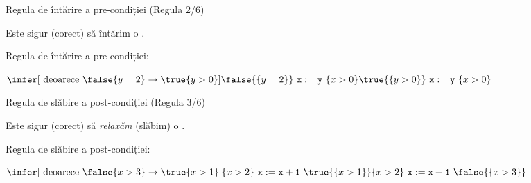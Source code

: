 \begin{frame}{Regula de întărire a pre-condiției (Regula 2/6)}

Este sigur (corect) să \alert{întărim} o .

\alert{Regula de întărire a pre-condiției:}
\begin{center}
\end{center}

\begin{example}
\begin{center}
$\infer[\mbox{ deoarece }\false{y=2} \to \true{y>0}]{\false{\{y=2\}}\ \mathtt{x := y}\ \{x>0\}}{\true{\{y>0\}}\ \mathtt{x := y}\ \{x>0\}}$
\end{center}

\end{example}
\end{frame}

\begin{frame}{Regula de slăbire a post-condiției (Regula 3/6)}

Este sigur (corect) să {\em relaxăm} (\alert{slăbim}) o .

\alert{Regula de slăbire a post-condiției:}
\begin{center}
\end{center}

\begin{example}
\begin{center}
$\infer[\mbox{ deoarece }\false{x>3} \to \true{x>1}]{\{x>2\}\ \mathtt{x := x+1}\ \true{\{x>1\}}}{{\{x>2\}}\ \mathtt{x := x+1}\ \false{\{x>3\}}}$
\end{center}

\end{example}
\end{frame}

